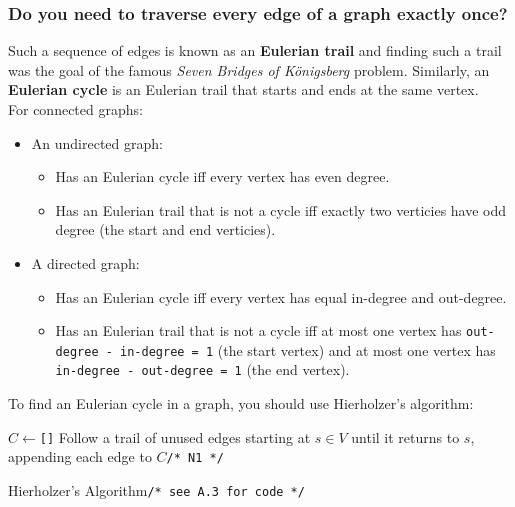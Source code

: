 \documentclass[12pt, titlepage]{article}
\begin{document}
\subsubsection{Do you need to traverse every edge of a graph exactly once?}

Such a sequence of edges is known as an \textbf{Eulerian trail} and finding such a trail was the goal of the famous \textit{Seven Bridges of K\"onigsberg} problem. Similarly, an \textbf{Eulerian cycle} is an Eulerian trail that starts and ends at the same vertex. \\

For connected graphs:
\begin{itemize}
  \item An undirected graph:
  \begin{itemize}
    \item Has an Eulerian cycle iff every vertex has even degree.
    \item Has an Eulerian trail that is not a cycle iff exactly two verticies have odd degree (the start and end verticies).
  \end{itemize}
  \item A directed graph:
  \begin{itemize}
    \item Has an Eulerian cycle iff every vertex has equal in-degree and out-degree.
    \item Has an Eulerian trail that is not a cycle iff at most one vertex has \texttt{out-degree - in-degree = 1} (the start vertex) and at most one vertex has \texttt{in-degree - out-degree = 1} (the end vertex). \medskip
  \end{itemize}
\end{itemize}

To find an Eulerian cycle in a graph, you should use Hierholzer's algorithm: \medskip

\begin{algorithm}[H]
  \SetAlgoLined
  \DontPrintSemicolon
  $C \longleftarrow$\hspace{0.5mm}\texttt{[]}\;
  Follow a trail of unused edges starting at $s \in V$ until it returns to $s$, appending each edge to $C$\hspace{58mm}\texttt{/* N1 */}\;
  \;
  \caption{Hierholzer's Algorithm\hspace{5mm}\texttt{/* see A.3 for code */}}
\end{algorithm} \medskip
\end{document}
